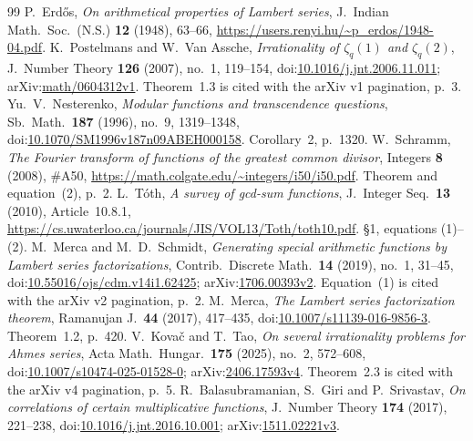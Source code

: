 \begin{thebibliography}{99}
P.~Erd\H{o}s, \emph{On arithmetical properties of Lambert series},
J.\ Indian Math.\ Soc.\ (N.S.) \textbf{12} (1948), 63--66,
\url{https://users.renyi.hu/~p_erdos/1948-04.pdf}.
K.~Postelmans and W.~Van Assche, \emph{Irrationality of $\zeta_q(1)$ and
$\zeta_q(2)$}, J.\ Number Theory \textbf{126} (2007), no.~1, 119--154,
doi:\href{https://doi.org/10.1016/j.jnt.2006.11.011}{10.1016/j.jnt.2006.11.011};
arXiv:\href{https://arxiv.org/abs/math/0604312v1}{math/0604312v1}.
Theorem~1.3 is cited with the arXiv v1 pagination, p.~3.
Yu.~V.~Nesterenko, \emph{Modular functions and transcendence questions},
Sb.\ Math.\ \textbf{187} (1996), no.~9, 1319--1348,
doi:\href{https://doi.org/10.1070/SM1996v187n09ABEH000158}{10.1070/SM1996v187n09ABEH000158}.
Corollary~2, p.~1320.
W.~Schramm, \emph{The Fourier transform of functions of the greatest common
divisor}, Integers \textbf{8} (2008), \#A50,
\url{https://math.colgate.edu/~integers/i50/i50.pdf}.
Theorem and equation~(2), p.~2.
L.~T\'oth, \emph{A survey of gcd-sum functions}, J.\ Integer Seq.\ \textbf{13}
(2010), Article~10.8.1,
\url{https://cs.uwaterloo.ca/journals/JIS/VOL13/Toth/toth10.pdf}.
\S1, equations (1)--(2).
M.~Merca and M.~D.~Schmidt, \emph{Generating special arithmetic functions by
Lambert series factorizations}, Contrib.\ Discrete Math.\ \textbf{14} (2019),
no.~1, 31--45,
doi:\href{https://doi.org/10.55016/ojs/cdm.v14i1.62425}{10.55016/ojs/cdm.v14i1.62425};
arXiv:\href{https://arxiv.org/abs/1706.00393v2}{1706.00393v2}.
Equation~(1) is cited with the arXiv v2 pagination, p.~2.
M.~Merca, \emph{The Lambert series factorization theorem},
Ramanujan J.\ \textbf{44} (2017), 417--435,
doi:\href{https://doi.org/10.1007/s11139-016-9856-3}{10.1007/s11139-016-9856-3}.
Theorem~1.2, p.~420.
V.~Kova\v{c} and T.~Tao, \emph{On several irrationality problems for Ahmes
series}, Acta Math.\ Hungar.\ \textbf{175} (2025), no.~2, 572--608,
doi:\href{https://doi.org/10.1007/s10474-025-01528-0}{10.1007/s10474-025-01528-0};
arXiv:\href{https://arxiv.org/abs/2406.17593v4}{2406.17593v4}.
Theorem~2.3 is cited with the arXiv v4 pagination, p.~5.
R.~Balasubramanian, S.~Giri and P.~Srivastav, \emph{On correlations of certain
multiplicative functions}, J.\ Number Theory \textbf{174} (2017), 221--238,
doi:\href{https://doi.org/10.1016/j.jnt.2016.10.001}{10.1016/j.jnt.2016.10.001};
arXiv:\href{https://arxiv.org/abs/1511.02221v3}{1511.02221v3}.

\end{thebibliography}
